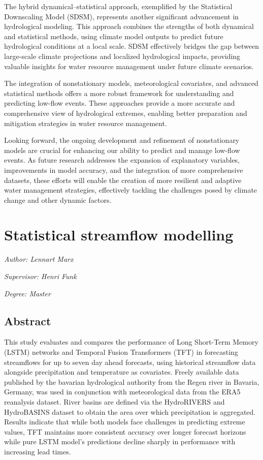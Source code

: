 \documentclass[
]{krantz}
\begin{document}
The hybrid dynamical--statistical approach, exemplified by the Statistical Downscaling Model (SDSM), represents another significant advancement in hydrological modeling. This approach combines the strengths of both dynamical and statistical methods, using climate model outputs to predict future hydrological conditions at a local scale. SDSM effectively bridges the gap between large-scale climate projections and localized hydrological impacts, providing valuable insights for water resource management under future climate scenarios.

The integration of nonstationary models, meteorological covariates, and advanced statistical methods offers a more robust framework for understanding and predicting low-flow events. These approaches provide a more accurate and comprehensive view of hydrological extremes, enabling better preparation and mitigation strategies in water resource management.

Looking forward, the ongoing development and refinement of nonstationary models are crucial for enhancing our ability to predict and manage low-flow events. As future research addresses the expansion of explanatory variables, improvements in model accuracy, and the integration of more comprehensive datasets, these efforts will enable the creation of more resilient and adaptive water management strategies, effectively tackling the challenges posed by climate change and other dynamic factors.

\chapter{Statistical streamflow modelling}\label{sm}

\emph{Author: Lennart Marx}

\emph{Supervisor: Henri Funk}

\emph{Degree: Master}

\section{Abstract}\label{abstract-4}

This study evaluates and compares the performance of Long Short-Term Memory (LSTM) networks and Temporal Fusion Transformers (TFT) in forecasting streamflows for up to seven day ahead forecasts, using historical streamflow data alongside precipitation and temperature as covariates. Freely available data published by the bavarian hydrological authority from the Regen river in Bavaria, Germany, was used in conjunction with meteorological data from the ERA5 reanalysis dataset. River basins are defined via the HydroRIVERS and HydroBASINS dataset to obtain the area over which precipitation is aggregated. Results indicate that while both models face challenges in predicting extreme values, TFT maintains more consistent accuracy over longer forecast horizons while pure LSTM model's predictions decline sharply in performance with increasing lead times.
\end{document}
